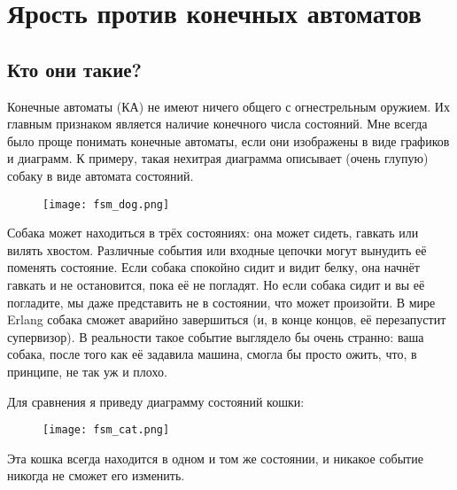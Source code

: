 \chapter{Ярость против конечных автоматов}
\label{rage-against-the-finite-state-machines}
\section{Кто они такие?}
\label{what-are-they}
Конечные автоматы (КА) не имеют ничего общего с огнестрельным оружием.
Их главным признаком является наличие конечного числа состояний.
Мне всегда было проще понимать конечные автоматы, если они изображены в виде графиков и диаграмм.
К примеру, такая нехитрая диаграмма описывает (очень глупую) собаку в виде автомата состояний.
\begin{figure}[h!]
    \centering
    \texttt{[image: fsm\_dog.png]}
\end{figure}
Собака может находиться в трёх состояниях: она может сидеть, гавкать или вилять хвостом.
Различные события или входные цепочки могут вынудить её поменять состояние.
Если собака спокойно сидит и видит белку, она начнёт гавкать и не остановится, пока её не погладят.
Но если собака сидит и вы её погладите, мы даже представить не в состоянии, что может произойти.
В мире Erlang собака сможет аварийно завершиться (и, в конце концов, её перезапустит супервизор).
В реальности такое событие выглядело бы очень странно: ваша собака, после того как её задавила машина, смогла бы просто ожить, что, в принципе, не так уж и плохо.

Для сравнения я приведу диаграмму состояний кошки:

\begin{figure}[h!]
    \centering
    \texttt{[image: fsm\_cat.png]}
\end{figure}

Эта кошка всегда находится в одном и том же состоянии, и никакое событие никогда не сможет его изменить.

